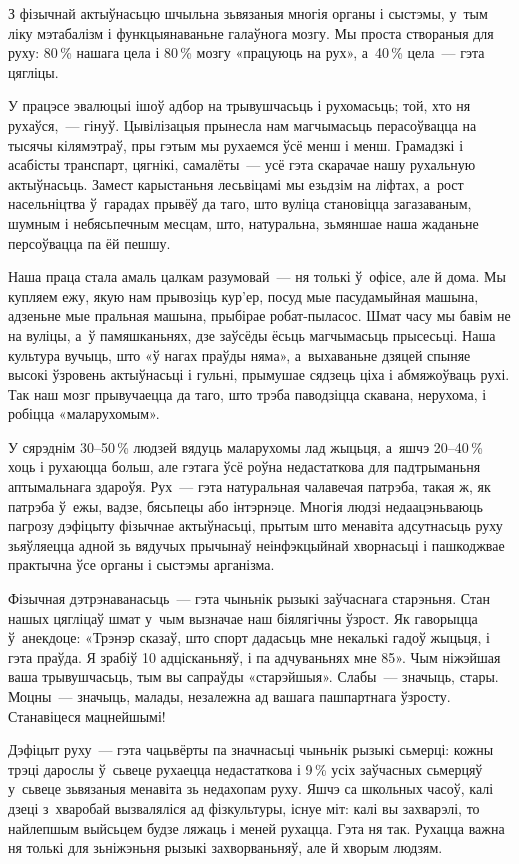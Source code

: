 З фізычнай актыўнасьцю шчыльна зьвязаныя многія органы і сыстэмы, у~тым ліку мэтабалізм і функцыянаваньне галаўнога мозгу. Мы проста створаныя для руху: 80\,\% нашага цела і 80\,\% мозгу «працуюць на рух», а~40\,\% цела~--- гэта цягліцы.

У працэсе эвалюцыі ішоў адбор на трывушчасьць і рухомасьць; той, хто ня рухаўся,~--- гінуў. Цывілізацыя прынесла нам магчымасьць перасоўвацца на тысячы кілямэтраў, пры гэтым мы рухаемся ўсё менш і менш. Грамадзкі і асабісты транспарт, цягнікі, самалёты~--- усё гэта скарачае нашу рухальную актыўнасьць. Замест карыстаньня лесьвіцамі мы езьдзім на ліфтах, а~рост насельніцтва ў~гарадах прывёў да таго, што вуліца становіцца загазаваным, шумным і небясьпечным месцам, што, натуральна, зьмяншае наша жаданьне персоўвацца па ёй пешшу.

Наша праца стала амаль цалкам разумовай~--- ня толькі ў~офісе, але й дома. Мы купляем ежу, якую нам прывозіць кур'ер, посуд мые пасудамыйная машына, адзеньне мые пральная машына, прыбірае робат-пыласос. Шмат часу мы бавім не на вуліцы, а~ў памяшканьнях, дзе заўсёды ёсьць магчымасьць прысесьці. Наша культура вучыць, што «ў нагах праўды няма», а~выхаваньне дзяцей спыняе высокі ўзровень актыўнасьці і гульні, прымушае сядзець ціха і абмяжоўваць рухі. Так наш мозг прывучаецца да таго, што трэба паводзіцца скавана, нерухома, і робіцца «маларухомым».

У сярэднім 30--50\,\% людзей вядуць маларухомы лад жыцьця, а~яшчэ 20--40\,\% хоць і рухаюцца больш, але гэтага ўсё роўна недастаткова для падтрыманьня аптымальнага здароўя. Рух~--- гэта натуральная чалавечая патрэба, такая ж, як патрэба ў~ежы, вадзе, бясьпецы або інтэрнэце. Многія людзі недаацэньваюць пагрозу дэфіцыту фізычнае актыўнасьці, прытым што менавіта адсутнасьць руху зьяўляецца адной зь вядучых прычынаў неінфэкцыйнай хворнасьці і пашкоджвае практычна ўсе органы і сыстэмы арганізма.

Фізычная дэтрэнаванасьць~--- гэта чыньнік рызыкі заўчаснага старэньня. Стан нашых цягліцаў шмат у~чым вызначае наш біялягічны ўзрост. Як гаворыцца ў~анекдоце: «Трэнэр сказаў, што спорт дадасьць мне некалькі гадоў жыцьця, і гэта праўда. Я зрабіў 10 адцісканьняў, і па адчуваньнях мне 85». Чым ніжэйшая ваша трывушчасьць, тым вы сапраўды «старэйшыя». Слабы~--- значыць, стары. Моцны~--- значыць, малады, незалежна ад вашага пашпартнага ўзросту. Станавіцеся мацнейшымі!

Дэфіцыт руху~--- гэта чацьвёрты па значнасьці чыньнік рызыкі сьмерці: кожны трэці дарослы ў~сьвеце рухаецца недастаткова і 9\,\% усіх заўчасных сьмерцяў у~сьвеце зьвязаныя менавіта зь недахопам руху. Яшчэ са школьных часоў, калі дзеці з~хваробай вызваляліся ад фізкультуры, існуе міт: калі вы захварэлі, то найлепшым выйсьцем будзе ляжаць і меней рухацца. Гэта ня так. Рухацца важна ня толькі для зьніжэньня рызыкі захворваньняў, але й хворым людзям.

